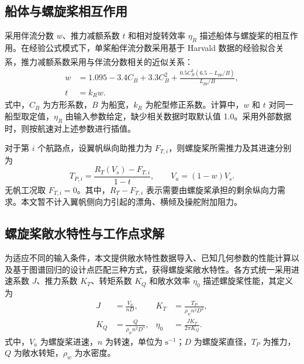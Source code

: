 \documentclass[UTF8,a4paper,twoside,zihao=5,fontset=windows]{ctexart}
\begin{document}
\subsection{船体与螺旋桨相互作用}

采用伴流分数 $w$、推力减额系数 $t$ 和相对旋转效率 $\eta_R$ 描述船体与螺旋桨的相互作用。在经验公式模式下，单桨船伴流分数采用基于 Harvald 数据的经验拟合关系\textsuperscript{\cite{harvald1983,molland2011}}，推力减额系数采用与伴流分数相关的近似关系\textsuperscript{\cite{molland2011}}：
\begin{equation}
\begin{aligned}
w&=1.095-3.4C_B+3.3C_B^2
+\frac{0.5C_B^2(6.5-L_{pp}/B)}{L_{pp}/B},\\
t&=k_Rw.
\end{aligned}
\label{eq:wake}
\end{equation}
式中，$C_B$ 为方形系数，$B$ 为船宽，$k_R$ 为舵型修正系数。计算中，$w$ 和 $t$ 对同一船型取定值，$\eta_R$ 由输入参数给定，缺少相关数据时取默认值 1.0。采用外部数据时，则按航速对上述参数进行插值。

对于第 $i$ 个航路点，设翼帆纵向助推力为 $F_{T,i}$，则螺旋桨所需推力及其进速分别为
\begin{equation}
T_{P,i}=\frac{R_T(V_s)-F_{T,i}}{1-t},\qquad V_a=(1-w)V_s.
\label{eq:required_thrust}
\end{equation}
无帆工况取 $F_{T,i}=0$。其中，$R_T-F_{T,i}$ 表示需要由螺旋桨承担的剩余纵向力需求。本文暂不计入翼帆侧向力引起的漂角、横倾及操舵附加阻力。

\subsection{螺旋桨敞水特性与工作点求解}
\label{sec:propeller-open-water}

为适应不同的输入条件，本文提供敞水特性数据导入、已知几何参数的性能计算以及基于图谱回归的设计点匹配三种方式，获得螺旋桨敞水特性。各方式统一采用进速系数 $J$、推力系数 $K_T$、转矩系数 $K_Q$ 和敞水效率 $\eta_0$ 描述螺旋桨性能，其定义为
\begin{equation}
\begin{aligned}
J&=\frac{V_a}{nD},& K_T&=\frac{T_P}{\rho_w n^2D^4},\\
K_Q&=\frac{Q}{\rho_w n^2D^5},& \eta_0&=\frac{JK_T}{2\pi K_Q}.
\end{aligned}
\label{eq:open_water}
\end{equation}
式中，$V_a$ 为螺旋桨进速，$n$ 为转速，单位为 $\mathrm{s}^{-1}$；$D$ 为螺旋桨直径，$T_P$ 为推力，$Q$ 为敞水转矩，$\rho_w$ 为水密度。
\end{document}
